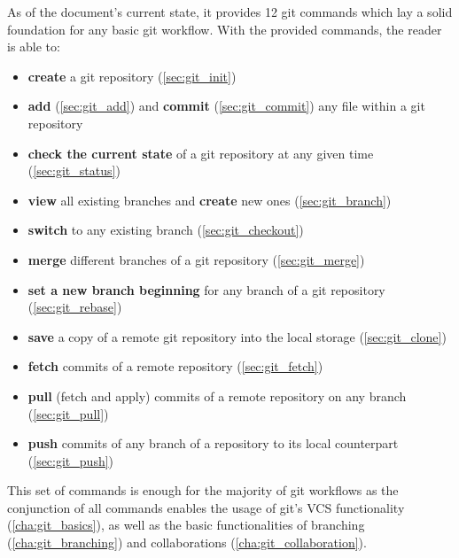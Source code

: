 As of the document's current state, it provides 12 git commands which lay a solid foundation for any basic git workflow. With the provided commands, the reader is able to: 
\begin{itemize} [nosep]
    \item \textbf{create} a git repository (\ref{sec:git_init})
    \item \textbf{add} (\ref{sec:git_add}) and \textbf{commit} (\ref{sec:git_commit}) any file within a git repository
    \item \textbf{check the current state} of a git repository at any given time (\ref{sec:git_status})
    \item \textbf{view} all existing branches and \textbf{create} new ones (\ref{sec:git_branch})
    \item \textbf{switch} to any existing branch (\ref{sec:git_checkout})
    \item \textbf{merge} different branches of a git repository (\ref{sec:git_merge})
    \item \textbf{set a new branch beginning} for any branch of a git repository (\ref{sec:git_rebase})
    \item \textbf{save} a copy of a remote git repository into the local storage (\ref{sec:git_clone})
    \item \textbf{fetch} commits of a remote repository (\ref{sec:git_fetch})
    \item \textbf{pull} (fetch and apply) commits of a remote repository on any branch (\ref{sec:git_pull})
    \item \textbf{push} commits of any branch of a repository to its local counterpart (\ref{sec:git_push})
\end{itemize}
This set of commands is enough for the majority of git workflows as the conjunction of all commands enables the usage of git's VCS functionality (\ref{cha:git_basics}), as well as the basic functionalities of branching (\ref{cha:git_branching}) and collaborations (\ref{cha:git_collaboration}).

